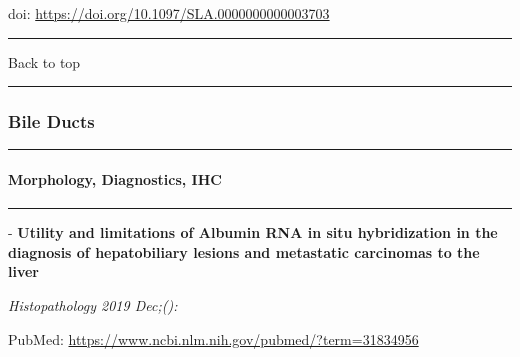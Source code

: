 \documentclass[
]{article}
\renewcommand{\linethickness}{0.05em}
\begin{document}
doi: \url{https://doi.org/10.1097/SLA.0000000000003703}

\begin{center}\rule{0.5\linewidth}{\linethickness}\end{center}

Back to top

\begin{center}\rule{0.5\linewidth}{\linethickness}\end{center}

\pagebreak

\hypertarget{bileducts}{%
\subsubsection{Bile Ducts}\label{bileducts}}

\begin{center}\rule{0.5\linewidth}{\linethickness}\end{center}

\hypertarget{bileducts_morphology}{%
\paragraph{Morphology, Diagnostics, IHC}\label{bileducts_morphology}}

\begin{center}\rule{0.5\linewidth}{\linethickness}\end{center}

- \textbf{Utility and limitations of Albumin RNA in situ hybridization
in the diagnosis of hepatobiliary lesions and metastatic carcinomas to
the liver}

\emph{Histopathology 2019 Dec;():}

PubMed: \url{https://www.ncbi.nlm.nih.gov/pubmed/?term=31834956}
\end{document}
